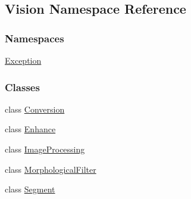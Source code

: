 \hypertarget{namespace_vision}{}\subsection{Vision Namespace Reference}
\label{namespace_vision}
\subsubsection*{Namespaces}
\begin{DoxyCompactItemize}
\item 
 \hyperlink{namespace_vision_1_1_exception}{Exception}
\end{DoxyCompactItemize}
\subsubsection*{Classes}
\begin{DoxyCompactItemize}
\item 
class \hyperlink{class_vision_1_1_conversion}{Conversion}
\item 
class \hyperlink{class_vision_1_1_enhance}{Enhance}
\item 
class \hyperlink{class_vision_1_1_image_processing}{Image\+Processing}
\item 
class \hyperlink{class_vision_1_1_morphological_filter}{Morphological\+Filter}
\item 
class \hyperlink{class_vision_1_1_segment}{Segment}
\end{DoxyCompactItemize}
